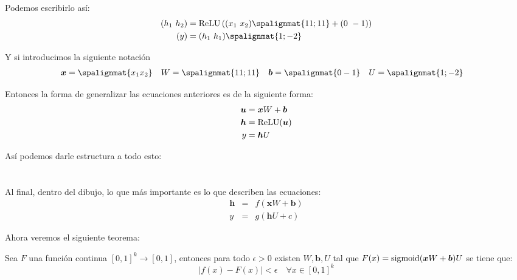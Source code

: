 \begin{example}
Podemos escribirlo así:
\begin{align*}
    (h_1 \ h_2) &= \relu\left( 
    (x_1 \ x_2) \spalignmat{1 1; 1 1} + (0 \ -1)
    \right) \\
    (y) &= (h_1 \ h_1) \spalignmat{1;-2}
\end{align*}

Y si introducimos la siguiente notación
\begin{align*}
    \bm{x} &= \spalignmat{x_1 x_2} & W &= \spalignmat{1 1; 1 1} & \bm{b} &= \spalignmat{0 -1} & U &= \spalignmat{1; -2}
\end{align*}

Entonces la forma de generalizar las ecuaciones anteriores es de la siguiente forma:
\begin{align*}
    \bm{u} &= \bm{x} W + \bm{b} \\
    \bm{h} &= \operatorname{ReLU}(\bm{u}) \\
    y &= \bm{h} U
\end{align*}
\end{example}

Así podemos darle estructura a todo esto:








\newpage
\section{}



Al final, dentro del dibujo, lo que más importante es lo que describen las ecuaciones:
\begin{eqnarray}
\bm{h} &=& f(\bm{x} W + \bm{b})\\
y &=& g(\bm{h} U + c)
\end{eqnarray}

Ahora veremos el siguiente teorema:

\begin{theorem}
Sea $F$ una función continua $[0, 1]^k \to [0, 1]$, entonces para todo $\epsilon>0$ existen $W, \bm{b}, U$ tal que $F(x) = \operatorname{sigmoid}(\bm{x}W + \bm{b})U$ se tiene que:
\begin{equation}
    |f(x) - F(x)|< \epsilon \quad \forall x \in [0, 1]^k
\end{equation}

\end{theorem}


